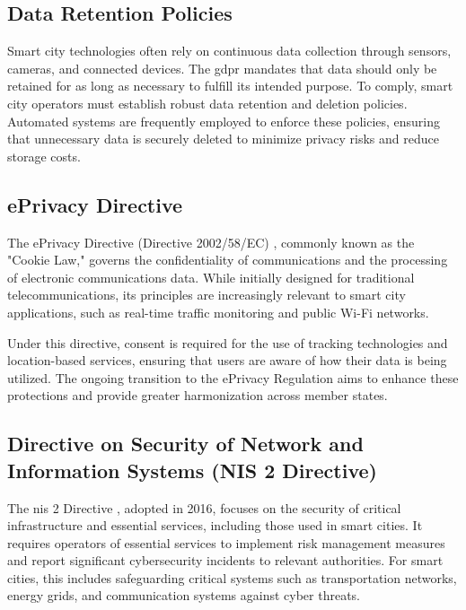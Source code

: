 \subsection{Data Retention Policies}

Smart city technologies often rely on continuous data collection through sensors, cameras, and connected devices. The \gls{gdpr} mandates that data should only be retained for as long as necessary to fulfill its intended purpose. To comply, smart city operators must establish robust data retention and deletion policies. Automated systems are frequently employed to enforce these policies, ensuring that unnecessary data is securely deleted to minimize privacy risks and reduce storage costs.

\subsection{ePrivacy Directive}

The ePrivacy Directive (Directive 2002/58/EC) \autocite{eu-58-2002}, commonly known as the "Cookie Law," governs the confidentiality of communications and the processing of electronic communications data. While initially designed for traditional telecommunications, its principles are increasingly relevant to smart city applications, such as real-time traffic monitoring and public Wi-Fi networks.

Under this directive, consent is required for the use of tracking technologies and location-based services, ensuring that users are aware of how their data is being utilized. The ongoing transition to the ePrivacy Regulation aims to enhance these protections and provide greater harmonization across member states.

\subsection{Directive on Security of Network and Information Systems (NIS 2 Directive)}

The \gls{nis} 2 Directive \autocite{eu-1148-2016}, adopted in 2016, focuses on the security of critical infrastructure and essential services, including those used in smart cities. It requires operators of essential services to implement risk management measures and report significant cybersecurity incidents to relevant authorities. For smart cities, this includes safeguarding critical systems such as transportation networks, energy grids, and communication systems against cyber threats.

